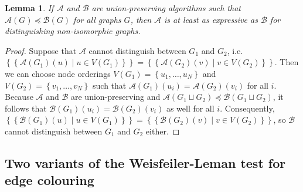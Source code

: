 \documentclass{article}
\newtheorem{lemma}[theorem]{Lemma}
\newcommand{\set}[1]{\left\{#1\right\}}
\newcommand{\multiset}[1]{\left\{\!\!\left\{#1\right\}\!\!\right\}}
\newcommand{\mca}{\mathcal{A}}
\newcommand{\mcb}{\mathcal{B}}
\begin{document}
\begin{lemma}   \label{lemma:refinement-distinguishability}
    If $\mca$ and $\mcb$ are union-preserving algorithms such that $\mca(G) \preceq \mcb(G)$ for all graphs $G$, then $\mca$ is at least as expressive as $\mcb$ for distinguishing non-isomorphic graphs.
\end{lemma}

\begin{proof}
    Suppose that $\mca$ cannot distinguish between $G_1$ and $G_2$, i.e. $\multiset{\mca(G_1)(u) \mid u\in V(G_1)} = \multiset{\mca(G_2)(v) \mid v\in V(G_2)}$. Then we can choose node orderings $V(G_1)=\set{u_1,\dots,u_N}$ and $V(G_2)=\set{v_1,\dots,v_N}$ such that $\mca(G_1)(u_i)=\mca(G_2)(v_i)$ for all $i$. Because $\mca$ and $\mcb$ are union-preserving and $\mca(G_1 \sqcup G_2) \preceq \mcb(G_1 \sqcup G_2)$, it follows that $\mcb(G_1)(u_i)=\mcb(G_2)(v_i)$ as well for all $i$. Consequently, $\multiset{\mcb(G_1)(u) \mid u\in V(G_1)} = \multiset{\mcb(G_2)(v) \mid v\in V(G_2)}$, so $\mcb$ cannot distinguish between $G_1$ and $G_2$ either.
\end{proof}


\subsection{Two variants of the Weisfeiler-Leman test for edge colouring}   \label{ssec:wl-variations}
\end{document}
